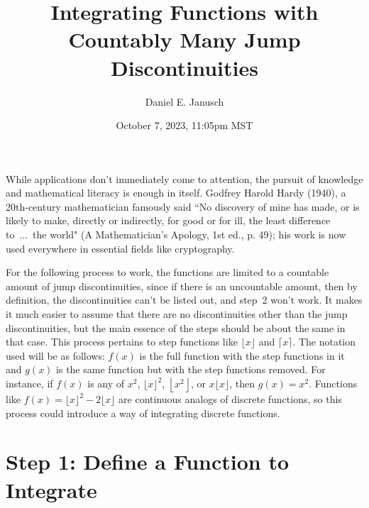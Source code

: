 \documentclass[12pt]{article}
\begin{document}
\title{Integrating Functions with Countably Many Jump Discontinuities}
\author{Daniel E. Janusch}
\date{October 7, 2023, 11:05pm MST}

\maketitle

	While applications don't immediately come to attention, the pursuit of knowledge and mathematical literacy
	is enough in itself. Godfrey Harold Hardy (1940), a 20th-century mathematician famously said ``No discovery
	of mine has made, or is likely to make, directly or indirectly, for good or for ill, the least difference
	to~...~the world" (A Mathematician's Apology, 1st ed., p. 49); his work is now used everywhere in essential
	fields like cryptography.

	For the following process to work, the functions are limited to a countable amount of jump discontinuities,
	since if there is an uncountable amount, then by definition, the discontinuities can't be listed out, and
	step~2 won't work. It makes it much easier to assume that there are no discontinuities other than the jump
	discontinuities, but the main essence of the steps should be about the same in that case. This process
	pertains to step functions like $\lfloor x\rfloor$ and $\lceil x\rceil$. The notation used will be as
	follows: $f(x)$ is the full function with the step functions in it and  $g(x)$ is the same function but
	with the step functions removed. For instance, if $f(x)$ is any of $x^2$, $\lfloor x\rfloor^2$,
	$\left\lfloor x^2\right\rfloor$, or $x\lfloor x\rfloor$, then $g(x)=x^2$. Functions like
	$f(x)=\lfloor x\rfloor^2-2\lfloor x\rfloor$ are continuous analogs of discrete functions, so this process
	could introduce a way of integrating discrete functions.

\section*{Step 1: Define a Function to Integrate}
\end{document}
